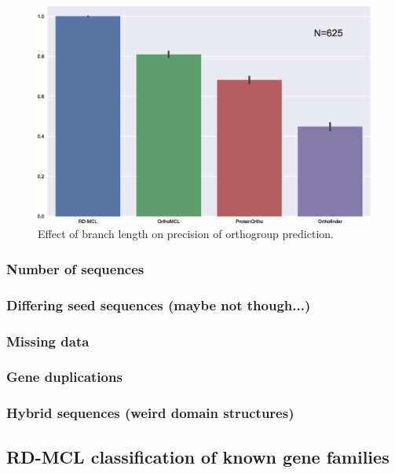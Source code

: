 \documentclass[twocolumn]{bmcart}%
\begin{document}
\begin{figure}[t]
  \begin{center}
  \includegraphics[height=0.22\textheight]{../figures/branch_len_bargraph.eps}
\end{center}
\caption{Effect of branch length on precision of orthogroup prediction.}
\label{fig:branch_len_std}
\end{figure}


\subsubsection{Number of sequences}
\lipsum[2]

\subsubsection{Differing seed sequences (maybe not though...)}
\lipsum[2]

\subsubsection{Missing data}
\lipsum[1]

\subsubsection{Gene duplications}
\lipsum[1]

\subsubsection{Hybrid sequences (weird domain structures)}
\lipsum[1]

\subsection{RD-MCL classification of known gene families}
\lipsum[1]
\end{document}
